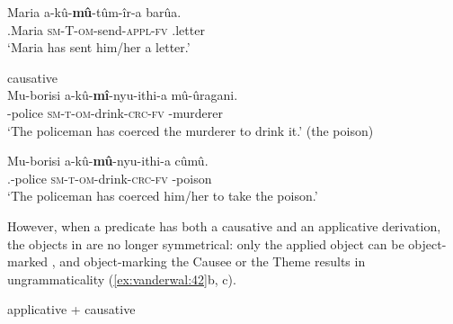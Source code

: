 \documentclass[output=paper]{LSP/langsci}
\begin{document}
 \ex\label{ex:vanderwal:40b}
\gll Maria  a-kû-\textbf{mû}{}-tûm-îr-a  barûa.\\
    .Maria  \textsc{sm-T-om}{}-send-\textsc{appl}{}-\textsc{fv}  .letter \\
    \glt ‘Maria has sent him/her a letter.’

    \z
\z


\ea\label{ex:vanderwal:41}%
 {causative}\\

 \ea\label{ex:vanderwal:41a}
\gll Mu-borisi  a-kû-\textbf{mî}{}-nyu-ithi-a  mû-ûragani.\\
    -police  \textsc{sm-t-om}{}-drink-\textsc{crc-fv}  -murderer\\
    \glt ‘The policeman has coerced the murderer to drink it.’ (the poison)

 \ex\label{ex:vanderwal:41b}
\gll Mu-borisi  a-kû-\textbf{mû}{}-nyu-ithi-a  cûmû.\\
    .-police  \textsc{sm-t-om}{}-drink-\textsc{crc-fv}  -poison\\
    \glt ‘The policeman has coerced him/her to take the poison.’
\z
\z


However, when a predicate has both a causative and an applicative derivation, the objects in  are no longer symmetrical: only the applied object can be object-marked , and object-marking the Causee or the Theme results in ungrammaticality (\ref{ex:vanderwal:42}b, c).

\ea\label{ex:vanderwal:42}%
{applicative + causative} \citep[83]{Muriungi2008}\\


\end{document}

